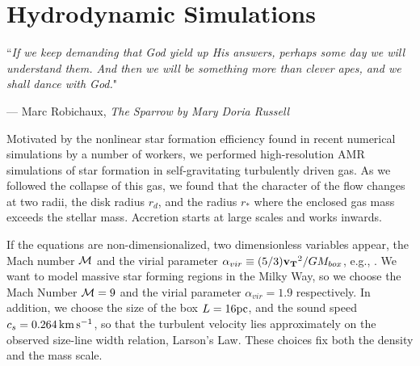 \documentclass[../dissertation.tex]{subfiles}
\begin{document}
\chapter{Hydrodynamic Simulations}
\label{ch:hydro}

\singlespace
\epigraph{``\emph{If we keep demanding that God yield up His answers, perhaps some day we will understand them. And then we will be something more than clever apes, and we shall dance with God.}"}{--- \textup{Marc Robichaux}, \textit{The Sparrow by Mary Doria Russell}}

\dblspace

%

Motivated by the nonlinear star formation efficiency found in recent numerical simulations by a number of workers, we performed high-resolution AMR simulations of star formation in self-gravitating turbulently driven gas. 
As we followed the collapse of this gas, we found that the character of the flow changes at two radii, the disk radius $r_d$, and the radius $r_*$ where the enclosed gas mass exceeds the stellar mass. 
Accretion starts at large scales and works inwards. 

If the equations are non-dimensionalized, two dimensionless variables appear, the Mach number ${\cal M}$ and the virial parameter $\alpha_{vir} \equiv (5/3) \mathbf{v_T}^2 / GM_{box}$, e.g., \citet{1984oup..book.....M}.
We want to model massive star forming regions in the Milky Way, so we choose the Mach Number ${\cal M} = 9$ and the virial parameter $\alpha_{vir} = 1.9$ respectively.
In addition, we choose the size of the box $L = 16 \rm pc$, and the sound speed $c_s = 0.264\,{\rm km\,s^{-1}}$, so that the turbulent velocity lies approximately on the observed size-line width relation, Larson's Law.
These choices fix both the density and the mass scale.
\end{document}
